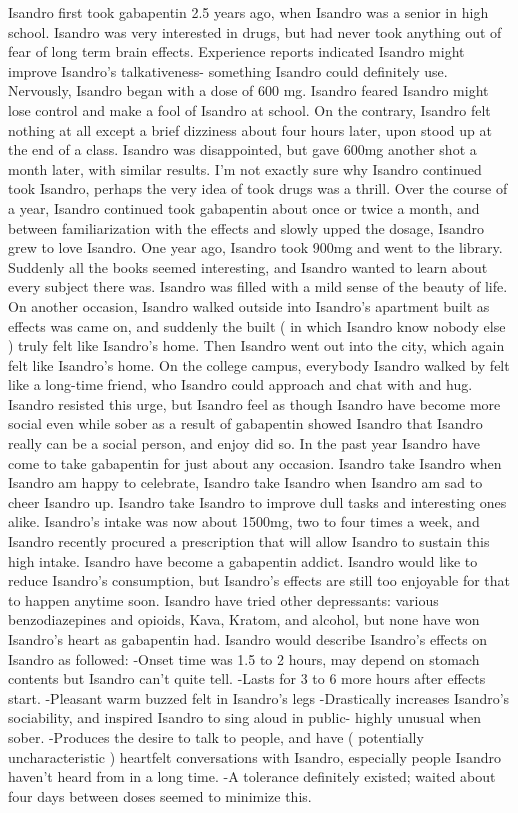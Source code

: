 \documentclass[12pt]{book}
\begin{document}
Isandro first took gabapentin 2.5 years ago, when Isandro was a senior in high school. Isandro was very interested in drugs, but had never took anything out of fear of long term brain effects. Experience reports indicated Isandro might improve Isandro's talkativeness- something Isandro could definitely use. Nervously, Isandro began with a dose of 600 mg. Isandro feared Isandro might lose control and make a fool of Isandro at school. On the contrary, Isandro felt nothing at all except a brief dizziness about four hours later, upon stood up at the end of a class. Isandro was disappointed, but gave 600mg another shot a month later, with similar results. I'm not exactly sure why Isandro continued took Isandro, perhaps the very idea of took drugs was a thrill. Over the course of a year, Isandro continued took gabapentin about once or twice a month, and between familiarization with the effects and slowly upped the dosage, Isandro grew to love Isandro. One year ago, Isandro took 900mg and went to the library. Suddenly all the books seemed interesting, and Isandro wanted to learn about every subject there was. Isandro was filled with a mild sense of the beauty of life. On another occasion, Isandro walked outside into Isandro's apartment built as effects was came on, and suddenly the built ( in which Isandro know nobody else ) truly felt like Isandro's home. Then Isandro went out into the city, which again felt like Isandro's home. On the college campus, everybody Isandro walked by felt like a long-time friend, who Isandro could approach and chat with and hug. Isandro resisted this urge, but Isandro feel as though Isandro have become more social even while sober as a result of gabapentin showed Isandro that Isandro really can be a social person, and enjoy did so. In the past year Isandro have come to take gabapentin for just about any occasion. Isandro take Isandro when Isandro am happy to celebrate, Isandro take Isandro when Isandro am sad to cheer Isandro up. Isandro take Isandro to improve dull tasks and interesting ones alike. Isandro's intake was now about 1500mg, two to four times a week, and Isandro recently procured a prescription that will allow Isandro to sustain this high intake. Isandro have become a gabapentin addict. Isandro would like to reduce Isandro's consumption, but Isandro's effects are still too enjoyable for that to happen anytime soon. Isandro have tried other depressants: various benzodiazepines and opioids, Kava, Kratom, and alcohol, but none have won Isandro's heart as gabapentin had. Isandro would describe Isandro's effects on Isandro as followed: -Onset time was 1.5 to 2 hours, may depend on stomach contents but Isandro can't quite tell. -Lasts for 3 to 6 more hours after effects start. -Pleasant warm buzzed felt in Isandro's legs -Drastically increases Isandro's sociability, and inspired Isandro to sing aloud in public- highly unusual when sober. -Produces the desire to talk to people, and have ( potentially uncharacteristic ) heartfelt conversations with Isandro, especially people Isandro haven't heard from in a long time. -A tolerance definitely existed; waited about four days between doses seemed to minimize this.
\end{document}
